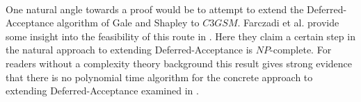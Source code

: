 \paragraph{}
One natural angle towards a proof would be to attempt to extend the Deferred-Acceptance algorithm of Gale and Shapley to $C3GSM$. Farczadi et al. provide some insight into the feasibility of this route in \cite{farczadi2014stable}. Here they claim a certain step in the natural approach to extending Deferred-Acceptance is $NP$-complete. For readers without a complexity theory background this result gives strong evidence that there is no polynomial time algorithm for the concrete approach to extending Deferred-Acceptance examined in \cite{farczadi2014stable}.
